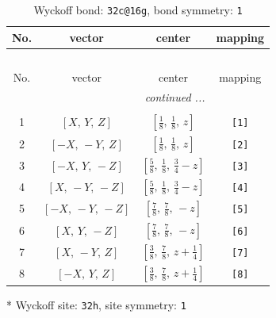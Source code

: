 \documentclass[fleqn,8pt]{jsarticle}
\begin{document}
\renewcommand{\arraystretch}{1.2}
\begin{longtable}{cccc}
\caption{Wyckoff bond: {\tt 32c@16g}, bond symmetry: {\tt 1}}
 \\
 \hline \hline
No. & vector & center & mapping \\ \hline \endfirsthead

\multicolumn{3}{l}{\tablename\ \thetable{}} \\
 \hline \hline
No. & vector & center & mapping \\ \hline \endhead

 \hline \hline
\multicolumn{3}{r}{\footnotesize\it continued ...} \\ \endfoot

 \hline \hline
\multicolumn{3}{r}{} \\ \endlastfoot

1 & $\left[ X,\, Y,\, Z \right]$ & $\left[ \frac{1}{8},\, \frac{1}{8},\, z \right]$ & {\tt [1]} \\ \hline
2 & $\left[ - X,\, - Y,\, Z \right]$ & $\left[ \frac{1}{8},\, \frac{1}{8},\, z \right]$ & {\tt [2]} \\ \hline
3 & $\left[ - X,\, Y,\, - Z \right]$ & $\left[ \frac{5}{8},\, \frac{1}{8},\, \frac{3}{4} - z \right]$ & {\tt [3]} \\ \hline
4 & $\left[ X,\, - Y,\, - Z \right]$ & $\left[ \frac{5}{8},\, \frac{1}{8},\, \frac{3}{4} - z \right]$ & {\tt [4]} \\ \hline
5 & $\left[ - X,\, - Y,\, - Z \right]$ & $\left[ \frac{7}{8},\, \frac{7}{8},\, - z \right]$ & {\tt [5]} \\ \hline
6 & $\left[ X,\, Y,\, - Z \right]$ & $\left[ \frac{7}{8},\, \frac{7}{8},\, - z \right]$ & {\tt [6]} \\ \hline
7 & $\left[ X,\, - Y,\, Z \right]$ & $\left[ \frac{3}{8},\, \frac{7}{8},\, z + \frac{1}{4} \right]$ & {\tt [7]} \\ \hline
8 & $\left[ - X,\, Y,\, Z \right]$ & $\left[ \frac{3}{8},\, \frac{7}{8},\, z + \frac{1}{4} \right]$ & {\tt [8]} \\
\end{longtable}
* Wyckoff site: {\tt 32h}, site symmetry: {\tt 1}
\renewcommand{\arraystretch}{1.2}
\end{document}
